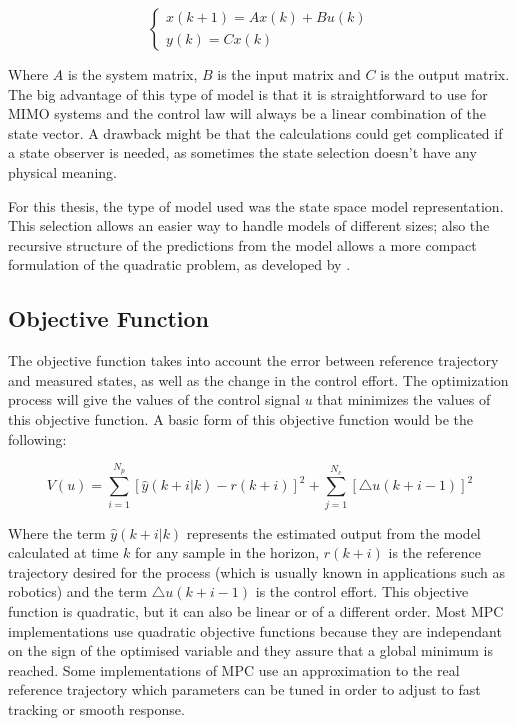 \begin{itemize}
\begin{equation} \label{statespacemodel1}
\begin{cases} x(k + 1) = Ax(k) + Bu(k) \\ y(k) = Cx(k)
\end{cases}
\end{equation}

Where $A$ is the system matrix, $B$ is the input matrix and $C$ is the output matrix. The big advantage of this type of model is that it is straightforward to use for MIMO systems and the control law will always be a linear combination of the state vector. A drawback might be that the calculations could get complicated if a state observer is needed, as sometimes the state selection doesn't have any physical meaning.

\end{itemize}

For this thesis, the type of model used was the state space model representation. This selection allows an easier way to handle models of different sizes; also the recursive structure of the predictions from the model allows a more compact formulation of the quadratic problem, as developed by \cite{Ferreau2011}.


 
\subsection{Objective Function}%

The objective function takes into account the error between reference trajectory and measured states, as well as the change in the control effort. The optimization process will give the values of the control signal $u$ that minimizes the values of this objective function. A basic form of this objective function would be the following:

\begin{equation} \label{objectivefunction1}
V(u) = \sum_{i=1}^{N_{p}}  [\hat{y}(k + i | k) - r(k + i)]^2 + \sum_{j=1}^{N_{c}} [\triangle u(k + i - 1)]^2
\end{equation}

Where the term $\hat{y}(k + i | k)$ represents the estimated output from the model calculated at time $k$ for any sample in the horizon, $r(k + i)$ is the reference trajectory desired for the process (which is usually known in applications such as robotics) and the term $\triangle u(k + i - 1)$ is the control effort. This objective function is quadratic, but it can also be linear or of a different order. Most MPC implementations use quadratic objective functions because they are independant on the sign of the optimised variable and they assure that a global minimum is reached. Some implementations of MPC use an approximation to the real reference trajectory which parameters can be tuned in order to adjust to fast tracking or smooth response.\\ 

